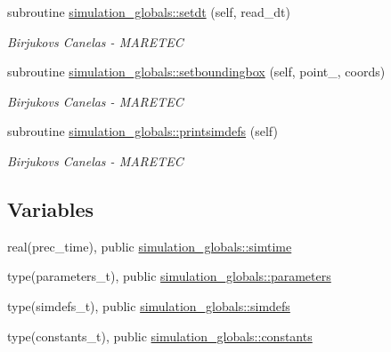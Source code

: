 \begin{DoxyCompactItemize}
subroutine \mbox{\hyperlink{namespacesimulation__globals_a3ef0462db5a60ac79304cabd2fdd914d}{simulation\+\_\+globals\+::setdt}} (self, read\+\_\+dt)
\begin{DoxyCompactList}\small\item\em Birjukovs Canelas -\/ M\+A\+R\+E\+T\+EC \end{DoxyCompactList}\item 
subroutine \mbox{\hyperlink{namespacesimulation__globals_a1fc4653684d73efecdbd140b6cafe541}{simulation\+\_\+globals\+::setboundingbox}} (self, point\+\_\+, coords)
\begin{DoxyCompactList}\small\item\em Birjukovs Canelas -\/ M\+A\+R\+E\+T\+EC \end{DoxyCompactList}\item 
subroutine \mbox{\hyperlink{namespacesimulation__globals_ad90d6959da1d43e2cd1febff82187ed5}{simulation\+\_\+globals\+::printsimdefs}} (self)
\begin{DoxyCompactList}\small\item\em Birjukovs Canelas -\/ M\+A\+R\+E\+T\+EC \end{DoxyCompactList}\end{DoxyCompactItemize}
\subsection*{Variables}
\begin{DoxyCompactItemize}
\item 
real(prec\+\_\+time), public \mbox{\hyperlink{namespacesimulation__globals_a10daac198c63b06f99ec0c01b614a352}{simulation\+\_\+globals\+::simtime}}
\item 
type(parameters\+\_\+t), public \mbox{\hyperlink{namespacesimulation__globals_ac23e87cbb2256792d683ab1bf5dc5e21}{simulation\+\_\+globals\+::parameters}}
\item 
type(simdefs\+\_\+t), public \mbox{\hyperlink{namespacesimulation__globals_ae851f977b442737307cd4bb76f2f68be}{simulation\+\_\+globals\+::simdefs}}
\item 
type(constants\+\_\+t), public \mbox{\hyperlink{namespacesimulation__globals_aa3e1a54abbb08d2c09978a3509ec4303}{simulation\+\_\+globals\+::constants}}
\end{DoxyCompactItemize}
